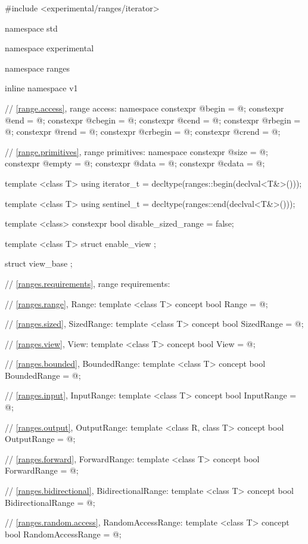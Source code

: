 %
\begin{codeblock}
#include <experimental/ranges/iterator>

namespace std { namespace experimental { namespace ranges { inline namespace v1 {
  // \ref{range.access}, range access:
  namespace {
    constexpr @\unspec@ begin = @\unspec@;
    constexpr @\unspec@ end = @\unspec@;
    constexpr @\unspec@ cbegin = @\unspec@;
    constexpr @\unspec@ cend = @\unspec@;
    constexpr @\unspec@ rbegin = @\unspec@;
    constexpr @\unspec@ rend = @\unspec@;
    constexpr @\unspec@ crbegin = @\unspec@;
    constexpr @\unspec@ crend = @\unspec@;
  }

  // \ref{range.primitives}, range primitives:
  namespace {
    constexpr @\unspec@ size = @\unspec@;
    constexpr @\unspec@ empty = @\unspec@;
    constexpr @\unspec@ data = @\unspec@;
    constexpr @\unspec@ cdata = @\unspec@;
  }

  template <class T>
  using iterator_t = decltype(ranges::begin(declval<T&>()));

  template <class T>
  using sentinel_t = decltype(ranges::end(declval<T&>()));

  template <class>
  constexpr bool disable_sized_range = false;

  template <class T>
  struct enable_view { };

  struct view_base { };

  // \ref{ranges.requirements}, range requirements:

  // \ref{ranges.range}, Range:
  template <class T>
  concept bool Range = @\seebelow@;

  // \ref{ranges.sized}, SizedRange:
  template <class T>
  concept bool SizedRange = @\seebelow@;

  // \ref{ranges.view}, View:
  template <class T>
  concept bool View = @\seebelow@;

  // \ref{ranges.bounded}, BoundedRange:
  template <class T>
  concept bool BoundedRange = @\seebelow@;

  // \ref{ranges.input}, InputRange:
  template <class T>
  concept bool InputRange = @\seebelow@;

  // \ref{ranges.output}, OutputRange:
  template <class R, class T>
  concept bool OutputRange = @\seebelow@;

  // \ref{ranges.forward}, ForwardRange:
  template <class T>
  concept bool ForwardRange = @\seebelow@;

  // \ref{ranges.bidirectional}, BidirectionalRange:
  template <class T>
  concept bool BidirectionalRange = @\seebelow@;

  // \ref{ranges.random.access}, RandomAccessRange:
  template <class T>
  concept bool RandomAccessRange = @\seebelow@;
}}}}
\end{codeblock}

